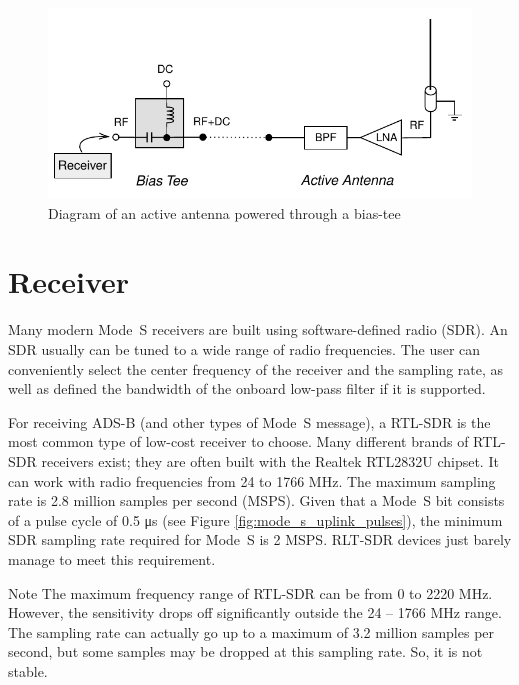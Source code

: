 \begin{figure}[ht]
  \centering
  \includegraphics[scale=0.9]{figures/quickstart/biastee_active_antenna.pdf}
  \caption{Diagram of an active antenna powered through a bias-tee}
  \label{fig:biastee_active_antenna}
\end{figure}


\section{Receiver}

Many modern Mode~S receivers are built using software-defined radio (SDR). An SDR usually can be tuned to a wide range of radio frequencies. The user can conveniently select the center frequency of the receiver and the sampling rate, as well as defined the bandwidth of the onboard low-pass filter if it is supported.

For receiving ADS-B (and other types of Mode~S message), a RTL-SDR is the most common type of low-cost receiver to choose. Many different brands of RTL-SDR receivers exist; they are often built with the Realtek RTL2832U chipset. It can work with radio frequencies from 24 to 1766 MHz. The maximum sampling rate is 2.8 million samples per second (MSPS). Given that a Mode~S bit consists of a pulse cycle of 0.5 μs (see Figure \ref{fig:mode_s_uplink_pulses}), the minimum SDR sampling rate required for Mode~S is 2 MSPS. RLT-SDR devices just barely manage to meet this requirement.

\begin{notebox}{Note}
  The maximum frequency range of RTL-SDR can be from 0 to 2220 MHz. However, the sensitivity drops off significantly outside the 24 -- 1766 MHz range. The sampling rate can actually go up to a maximum of 3.2 million samples per second, but some samples may be dropped at this sampling rate. So, it is not stable.
\end{notebox}

